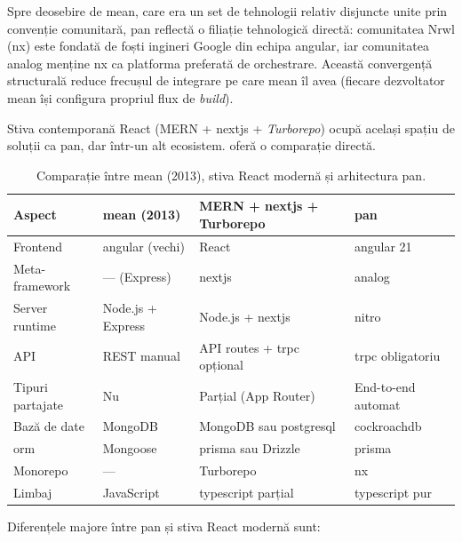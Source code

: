 Spre deosebire de \gls{mean}, care era un set de tehnologii relativ disjuncte unite prin convenție comunitară, \gls{pan} reflectă o filiație tehnologică directă: comunitatea Nrwl (\gls{nx}) este fondată de foști ingineri Google din echipa \gls{angular}, iar comunitatea \gls{analog} menține \gls{nx} ca platforma preferată de orchestrare.
Această convergență structurală reduce frecușul de integrare pe care \gls{mean} îl avea (fiecare dezvoltator \gls{mean} își configura propriul flux de \textit{build}).

Stiva contemporană React (MERN + \gls{nextjs} + \textit{Turborepo}) ocupă același spațiu de soluții ca \gls{pan}, dar într-un alt ecosistem.
 oferă o comparație directă.

\begin{table}[htbp]
\centering
\caption{Comparație între \gls{mean} (2013), stiva React modernă și arhitectura \gls{pan}.}
\label{tab:pan-vs-altele}
\small
\begin{tabularx}{\textwidth}{lYYY}
\toprule
\textbf{Aspect} & \textbf{\gls{mean} (2013)} & \textbf{MERN + \gls{nextjs} + Turborepo} & \textbf{\gls{pan}} \\
\midrule
Frontend         & \gls{angular} (vechi)   & React                  & \gls{angular} 21 \\
Meta-framework   & --- (Express)           & \gls{nextjs}           & \gls{analog} \\
Server runtime   & Node.js + Express       & Node.js + \gls{nextjs} & \gls{nitro} \\
API   & REST manual             & API routes + \gls{trpc} opțional & \gls{trpc} obligatoriu \\
Tipuri partajate & Nu                      & Parțial (App Router)   & End-to-end automat \\
Bază de date     & MongoDB                 & MongoDB sau \gls{postgresql} & \gls{cockroachdb} \\
\gls{orm}        & Mongoose                & \gls{prisma} sau Drizzle & \gls{prisma} \\
Monorepo         & ---                     & Turborepo              & \gls{nx} \\
Limbaj           & JavaScript              & \gls{typescript} parțial & \gls{typescript} pur \\
\bottomrule
\end{tabularx}
\end{table}

Diferențele majore între \gls{pan} și stiva React modernă sunt:

